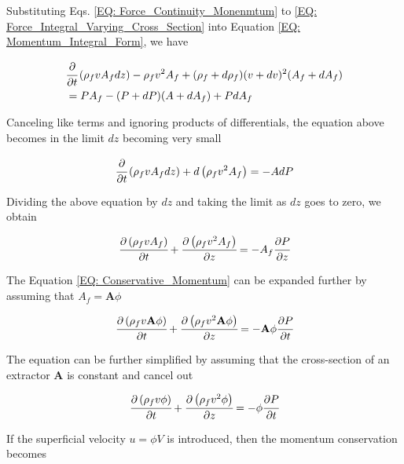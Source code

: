 \documentclass[../Article_Sensitivity_Analsysis.tex]{subfiles}
\begin{document}
	Substituting Eqs. \ref{EQ: Force_Continuity_Monenmtum} to \ref{EQ: Force_Integral_Varying_Cross_Section} into Equation \ref{EQ: Momentum_Integral_Form}, we have
	
	{\footnotesize
		\begin{align}
			& \cfrac{\partial}{\partial t} \left( \rho_f v A_f dz \right) - \rho_f v^2 A_f + (\rho_f + d\rho_f)(v+dv)^2(A_f+dA_f)  \nonumber \\
			&= PA_f - (P+dP)(A+dA_f)+PdA_f
		\end{align}
	}
	
	Canceling like terms and ignoring products of differentials, the equation above becomes in the limit $dz$ becoming  very small
	
	{\footnotesize
		\begin{equation}
			\cfrac{\partial}{\partial t} \left( \rho_f v A_f dz \right) + d\left( \rho_f v^2 A_f \right) = -A dP
		\end{equation}
	}

	Dividing the above equation by $dz$ and taking the limit as $dz$ goes to zero, we obtain
	
	{\footnotesize
		\begin{equation}
			\cfrac{\partial \left( \rho_f v A_f \right)}{\partial t} + \cfrac{\partial \left( \rho_f v^2 A_f \right)}{\partial z} = -A_f \cfrac{\partial P}{\partial z}
			\label{EQ: Conservative_Momentum}
		\end{equation}
	}

	The Equation \ref{EQ: Conservative_Momentum} can be expanded further by assuming that $A_f = \textbf{A}\phi$ 
	
	{\footnotesize
		\begin{equation}
			\cfrac{\partial \left( \rho_f v \textbf{A} \phi \right) }{\partial t} + \cfrac{\partial \left( \rho_f v^2 \textbf{A} \phi \right) }{\partial z} = - 	\textbf{A} \phi \cfrac{\partial P}{\partial t}
		\end{equation}
	}

	The equation can be further simplified by assuming that the cross-section of an extractor $\textbf{A}$ is constant and cancel out
	
	{\footnotesize
		\begin{equation}
			\cfrac{\partial \left( \rho_f v \phi \right) }{\partial t} + \cfrac{\partial \left( \rho_f v^2 \phi \right) }{\partial z} = - \phi 	\cfrac{\partial P}{\partial t}
		\end{equation}
	}

	If the superficial velocity $u=\phi V$ is introduced, then the momentum conservation becomes
	
\end{document}
